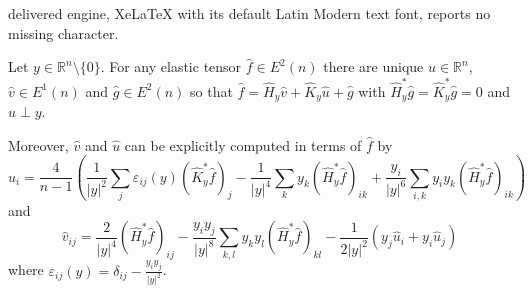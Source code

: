 \documentclass[10pt,a4paper]{amsart}
\newcommand{\abs}[1]{\lvert #1 \rvert}
\begin{document}
delivered engine, XeLaTeX with its default Latin Modern text font, reports no missing character.
\begin{lemma}
\label{lem:E2-decomposition}
Let $y \in \mathbb{R}^n\setminus \{0\}$. For any elastic tensor $\widehat f \in E^2(n)$ there are unique $\widehat u \in \mathbb{R}^n$, $\widehat v \in E^1(n)$ and $\widehat g \in E^2(n)$ so that $\widehat f = \widehat{H}_y \widehat v + \widehat{K}_y \widehat u + \widehat g$ with $\widehat{H}^*_y\widehat g = \widehat{K}^*_y\widehat g = 0$ and $\widehat u \perp y$.

Moreover, $\widehat v$ and $\widehat u$ can be explicitly computed in terms of $\widehat f$ by
\begin{equation}
\label{eqn:hat-u}
\widehat u_i
=
\frac{4}{n-1}
\left(
\frac{1}{\abs{y}^2}
\sum_j
\varepsilon_{ij}(y)
(\widehat{K}^*_y\widehat f)_j
-
\frac{1}{\abs{y}^4}
\sum_k
y_k(\widehat{H}^*_y\widehat f)_{ik}
+
\frac{y_i}{\abs{y}^6}
\sum_{i,k}
y_iy_k
(\widehat{H}^*_y\widehat f)_{ik}
\right)
\end{equation}
and
\begin{equation}
\label{eqn:hat-v}
\widehat v_{ij}
=
\frac{2}{\abs{y}^4}
(\widehat{H}^*_y\widehat f)_{ij}
-
\frac{y_iy_j}{\abs{y}^8}
\sum_{k,l}y_ky_l
(\widehat{H}^*_y\widehat f)_{kl}
-
\frac{1}{2\abs{y}^2}(y_j\widehat u_i + y_i\widehat u_j)
\end{equation}
where $\varepsilon_{ij}(y) = \delta_{ij}-\frac{y_iy_j}{\abs{y}^{2}}$.
\end{lemma}
\end{document}
